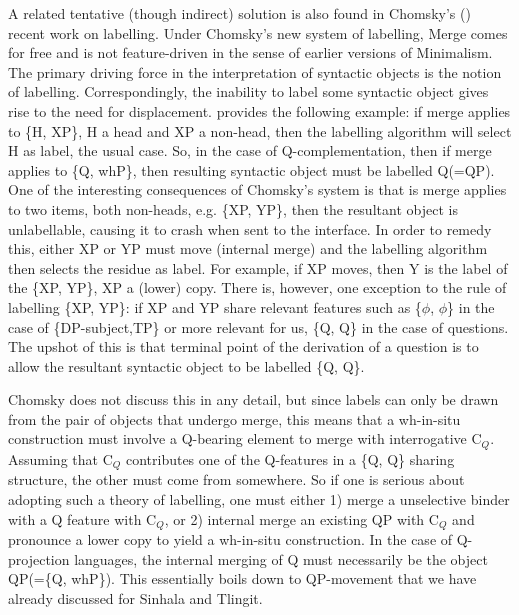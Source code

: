 \documentclass[charis]{glossa}
\begin{document}
A related tentative (though indirect) solution is also found in Chomsky's (\citeyear{Chomsky:13, chomsky:15}) recent work on labelling. Under Chomsky's new system of labelling, Merge comes for free and is not feature-driven in the sense of earlier versions of Minimalism. The primary driving force in the interpretation of syntactic objects is the notion of labelling. Correspondingly, the inability to label some syntactic object gives rise to the need for displacement. \cite{Chomsky:13} provides the following example: if merge applies to \{H, XP\}, H a head and XP a non-head, then the labelling algorithm will select H as label, the usual case. So, in the case of Q-complementation, then if merge applies to \{Q, whP\}, then resulting syntactic object must be labelled Q(=QP). One of the interesting consequences of Chomsky's system is that is merge applies to two items, both non-heads, e.g. \{XP, YP\}, then the resultant object is unlabellable, causing it to crash when sent to the interface. In order to remedy this, either XP or YP must move (internal merge) and the labelling algorithm then selects the residue as label. For example, if XP moves, then Y is the label of the \{XP, YP\}, XP a (lower) copy. There is, however, one exception to the rule of labelling \{XP, YP\}: if XP and YP share relevant features such as \{$\phi$, $\phi$\} in the case of \{DP-subject,TP\} or more relevant for us, \{Q, Q\} in the case of questions. The upshot of this is that terminal point of the derivation of a question is to allow the resultant syntactic object to be labelled \{Q, Q\}.

Chomsky does not discuss this in any detail, but since labels can only be drawn from the pair of objects that undergo merge, this means that a wh-in-situ construction must involve a Q-bearing element to merge with interrogative C$_Q$. Assuming that C$_Q$ contributes one of the Q-features in a \{Q, Q\} sharing structure, the other must come from somewhere. So if one is serious about adopting such a theory of labelling, one must either 1) merge a unselective binder with a Q feature with C$_Q$, or 2) internal merge an existing QP with C$_Q$ and pronounce a lower copy to yield a wh-in-situ construction. In the case of Q-projection languages, the internal merging of Q must necessarily be the object QP(=\{Q, whP\}). This essentially boils down to QP-movement that we have already discussed for Sinhala and Tlingit.
\end{document}

